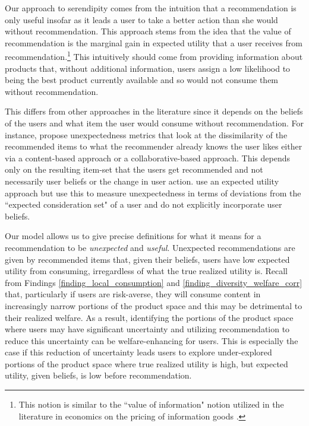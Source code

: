 \documentclass[sigconf]{acmart}
\begin{document}
Our approach to serendipity comes from the intuition that a recommendation is only useful insofar as it leads a user to take a better action than she would without recommendation. This approach stems from the idea that the value of recommendation is the marginal gain in expected utility that a user receives from recommendation.\footnote{This notion is similar to the ``value of information" notion utilized in the literature in economics on the pricing of information goods \cite{bergemann2018design}.} This intuitively should come from providing information about products that, without additional information, users assign a low likelihood to being the best product currently available and so would not consume them without recommendation.

This differs from other approaches in the literature since it depends on the beliefs of the users and what item the user would consume without recommendation. For instance, \cite{vargas2011rank, kaminskas2014measuring} propose unexpectedness metrics that look at the dissimilarity of the recommended items to what the recommender already knows the user likes either via a content-based approach or a collaborative-based approach. This depends only on the resulting item-set that the users get recommended and not necessarily user beliefs or the change in user action. \cite{adamopoulos2015unexpectedness} use an expected utility approach but use this to measure unexpectedness in terms of deviations from the ``expected consideration set" of a user and do not explicitly incorporate user beliefs.

Our model allows us to give precise definitions for what it means for a recommendation to be \textit{unexpected} and \textit{useful}. Unexpected recommendations are given by recommended items that, given their beliefs, users have low expected utility from consuming, irregardless of what the true realized utility is. Recall from Findings \ref{finding_local_consumption} and \ref{finding_diversity_welfare_corr} that, particularly if users are risk-averse, they will consume content in increasingly narrow portions of the product space and this may be detrimental to their realized welfare. As a result, identifying the portions of the product space where users may have significant uncertainty and utilizing recommendation to reduce this uncertainty can be welfare-enhancing for users. This is especially the case if this reduction of uncertainty leads users to explore under-explored portions of the product space where true realized utility is high, but expected utility, given beliefs, is low before recommendation.
\end{document}
